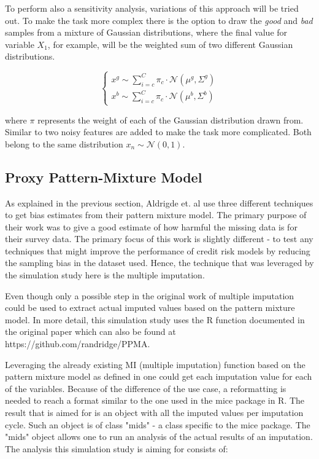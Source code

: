 \documentclass[11pt,a4paper]{article}
\begin{document}
To perform also a sensitivity analysis, variations of this approach will be tried out. To make the task more complex there is the option to draw the \textit{good} and \textit{bad} samples from a mixture of Gaussian distributions, where the final value for variable $X_1$, for example, will be the weighted sum of two different Gaussian distributions. 

$$ 
\begin{cases}
x^g \sim \sum_{i=c}^{C} \pi_c \cdot \mathcal{N}\left(\mu^g, \Sigma^g\right) \\
x^b \sim \sum_{i=c}^{C} \pi_c \cdot \mathcal{N}\left(\mu^b, \Sigma^b\right)
\end{cases}
$$

where $\pi$ represents the weight of each of the Gaussian distribution drawn from. Similar to \cite{Lessmann} two noisy features are added to make the task more complicated. Both belong to the same distribution 
$x_n \sim \mathcal{N}\left(0, 1\right)$. 


\subsection{Proxy Pattern-Mixture Model} \label{ppma}

As explained in the previous section, Aldrigde et. al \cite{Andridge_Little_2020}
use three different techniques to get bias estimates from their pattern mixture model. The primary purpose of their work was to give a good estimate of how harmful the missing data is for their survey data. The primary focus of this work is slightly different - to test any techniques that might improve the performance of credit risk models by reducing the sampling bias in the dataset used. Hence, the technique that was leveraged by the simulation study here is the multiple imputation. 

Even though only a possible step in the original work of \cite{Andridge_Little_2020}
multiple imputation could be used to extract actual imputed values based on the pattern mixture model. In more detail, this simulation study uses the R function documented in the original paper which can also be found at https://github.com/randridge/PPMA. 

Leveraging the already existing MI (multiple imputation) function based on the pattern mixture model as defined in \cite{Andridge_Little_2020} one could get each imputation value for each of the variables. Because of the difference of the use case, a reformatting is needed to reach a format similar to the one used in the mice package in R. The result that is aimed for is an object with all the imputed values per imputation cycle. Such an object is of class "mids" - a class specific to the mice package. The "mids" object allows one to run an analysis of the actual results of an imputation. The analysis this simulation study is aiming for consists of: 
\end{document}
